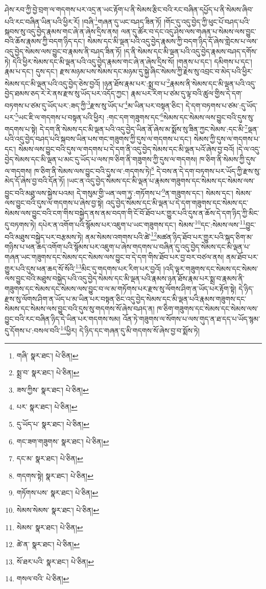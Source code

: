 ཤེས་རབ་ཀྱི་བྱེ་བྲག་ལ་གདགས་པར་འདྲ་ན་ཡང་རྟོག་པ་ནི་སེམས་རྩིང་བའི་རང་བཞིན་དཔྱོད་པ་ནི་སེམས་ཞིབ་པའི་རང་བཞིན་ཡིན་པའི་ཕྱིར་རོ། །བཞི་\footnote{གཞི་  སྣར་ཐང་།  པེ་ཅིན། }གཞན་དུ་ཡང་བཤད་ཟིན་ཏོ། །གོང་དུ་འདུ་བྱེད་ཀྱི་ཕུང་པོ་བཤད་པའི་སྐབས་སུ་འདུ་བྱེད་རྣམས་གང་ཞེ་ན་ཞེས་དྲིས་ནས། ལན་དུ་ཚོར་བ་དང་འདུ་ཤེས་ལས་གཞན་པ་སེམས་ལས་བྱུང་བའི་ཆོས་རྣམས་ཀྱི་བདག་ཉིད་དང་། སེམས་དང་མི་ལྡན་པའི་འདུ་བྱེད་རྣམས་ཀྱི་བདག་ཉིད་དོ་ཞེས་གླེངས་པ་ལས་འདུ་བྱེད་སེམས་ལས་བྱུང་བ་རྣམས་ནི་བཤད་ཟིན་ཏོ། །ད་ནི་སེམས་དང་མི་ལྡན་པའི་འདུ་བྱེད་རྣམས་བཤད་དགོས་ཏེ། དེའི་ཕྱིར་སེམས་དང་མི་ལྡན་པའི་འདུ་བྱེད་རྣམས་གང་ཞེ་ན་ཞེས་དྲིས་སོ། །གནས་པ་དང་། དམིགས་པ་དང་། རྣམ་པ་དང་། དུས་དང་། རྫས་མཉམ་པས་སེམས་དང་མཉམ་དུ་སྐྱེ་ཞིང་སེམས་ཀྱི་རྗེས་སུ་འབྲང་བ་མེད་པའི་ཕྱིར་སེམས་དང་མི་ལྡན་པའི་འདུ་བྱེད་ཅེས་བྱའོ། །ཉན་ཐོས་རྣམ་པར་:སྨྲ་བ་པ་\footnote{སྨྲ་བ་  སྣར་ཐང་།  པེ་ཅིན། }རྣམས་ནི་སེམས་དང་མི་ལྡན་པའི་འདུ་བྱེད་ཐམས་ཅད་རེ་རེ་ནས་རྫས་སུ་ཡོད་པར་འདོད་ཀྱང་། རྣམ་པར་རིག་པ་ཙམ་དུ་ལྟ་བའི་ཚུལ་གྱིས་དེ་དག་བཏགས་པ་ཙམ་དུ་ཡོད་པར་:ཟད་ཀྱི་\footnote{ཟས་ཀྱིས་  སྣར་ཐང་།  པེ་ཅིན། }རྫས་སུ་ཡོད་པ་\footnote{པར་  སྣར་ཐང་།  པེ་ཅིན། }མ་ཡིན་པར་བསྟན་ཅིང་། དེ་དག་བཏགས་པ་ཙམ་:དུ་ཡོད་པར་\footnote{དུ་ཡོད་པ་  སྣར་ཐང་།  པེ་ཅིན། }ཡང་ཇི་ལ་གདགས་པ་བསྟན་པའི་ཕྱིར། :གང་དག་གཟུགས་དང་\footnote{གང་ཟག་གཟུགས་  སྣར་ཐང་།  པེ་ཅིན། }སེམས་དང་སེམས་ལས་བྱུང་བའི་དུས་སུ་གདགས་པ་སྟེ། དེ་དག་ནི་སེམས་དང་མི་ལྡན་པའི་འདུ་བྱེད་ཡིན་ནོ་ཞེས་མ་སྨོས་སུ་ཟིན་ཀྱང་སེམས་:དང་མི་\footnote{དང་མ་  སྣར་ཐང་།  པེ་ཅིན། }ལྡན་པའི་འདུ་བྱེད་བཤད་པའི་སྐབས་ཡིན་པས་གང་གཟུགས་ཀྱི་དུས་ལ་གདགས་པ་དང་། སེམས་ཀྱི་དུས་ལ་གདགས་པ་དང་། སེམས་ལས་བྱུང་བའི་དུས་ལ་གདགས་པ་དེ་དག་ནི་འདུ་བྱེད་སེམས་དང་མི་ལྡན་པའོ་ཞེས་བྱ་བའོ། །དེ་ལ་འདུ་བྱེད་སེམས་དང་མི་ལྡན་པ་མང་དུ་ཡོད་པ་ལས་ཁ་ཅིག་ནི་གཟུགས་ཀྱི་དུས་ལ་གདགས། ཁ་ཅིག་ནི་སེམས་ཀྱི་དུས་ལ་གདགས། ཁ་ཅིག་ནི་སེམས་ལས་བྱུང་བའི་དུས་ལ་:གདགས་ཏེ།\footnote{གདགས་སྟེ།  སྣར་ཐང་།  པེ་ཅིན། } དེ་བས་ན་དེ་དག་བཏགས་པར་ཡོད་ཀྱི་རྫས་སུ་མེད་དོ་ཞེས་བྱ་བའི་དོན་ཏོ། །ཡང་ན་འདུ་བྱེད་སེམས་དང་མི་ལྡན་པ་རྣམས་གཟུགས་དང་སེམས་དང་སེམས་ལས་བྱུང་བའི་མཐུ་ལས་སྐྱེས་པའམ། དེ་གསུམ་གྱི་ཡན་ལག་ཏུ་:གཏོགས་པ་\footnote{གཏོགས་པས་  སྣར་ཐང་།  པེ་ཅིན། }ན་གཟུགས་དང་། སེམས་དང་། སེམས་ལས་བྱུང་བའི་དུས་ལ་གདགས་པ་ཞེས་བྱ་སྟེ། འདུ་བྱེད་སེམས་དང་མི་ལྡན་པ་དེ་དག་གཟུགས་དང་སེམས་དང་སེམས་ལས་བྱུང་བའི་ངག་གིས་བསྐྱེད་ནས་ནམ་བདག་གི་ངོ་བོ་ཐོབ་པར་གྱུར་པའི་དུས་ན་ཆོས་དེ་དག་ཉིད་ཀྱི་མིང་དུ་བཏགས་ཏེ། དཔེར་ན་འགོག་པའི་སྙོམས་པར་འཇུག་པ་ཡང་གཟུགས་དང་། སེམས་\footnote{སེམས་སེམས་  སྣར་ཐང་།  པེ་ཅིན། }དང་:སེམས་ལས་\footnote{སེམས་  སྣར་ཐང་།  པེ་ཅིན། }བྱུང་བའི་མཐུས་བསྐྱེད་པར་བརྩམས་ཏེ། ནམ་སེམས་འགགས་པའི་ཚེ་\footnote{ཚེ་ན་  སྣར་ཐང་།  པེ་ཅིན། }མཚན་ཉིད་ཐོབ་པར་གྱུར་པའི་སྐད་ཅིག་མ་གཉིས་པ་ཕན་ཆད་འགོག་པའི་སྙོམས་པར་འཇུག་པ་ཞེས་གདགས་པ་བཞིན་དུ་འདུ་བྱེད་སེམས་དང་མི་ལྡན་པ་གཞན་ཡང་གཟུགས་དང་སེམས་དང་སེམས་ལས་བྱུང་བ་དེ་དག་གིས་ཐོབ་པར་བྱ་བར་བཙལ་ནས། ནམ་ཐོབ་པར་གྱུར་པའི་དུས་ཕན་ཆད་སོ་སོའི་\footnote{སོ་ཐར་པའི་  སྣར་ཐང་།  པེ་ཅིན། }མིང་དུ་གདགས་པར་རིག་པར་བྱའོ། །འདི་ལྟར་གཟུགས་དང་སེམས་དང་སེམས་ལས་བྱུང་བའི་མཐུས་བསྐྱེད་པའི་འདུ་བྱེད་སེམས་དང་མི་ལྡན་པའི་རྣམས་ཉན་ཐོས་རྣམ་པར་སྨྲ་བ་རྣམས་ནི་གཟུགས་དང་སེམས་དང་སེམས་ལས་བྱུང་བ་ལ་མ་གཏོགས་པར་རྫས་སུ་ལོགས་ཤིག་ན་ཡོད་པར་རྟོག་སྟེ། དེ་ཉིད་རྫས་སུ་ལོགས་ཤིག་ན་ཡོད་པ་མ་ཡིན་པར་བསྟན་ཅིང་འདུ་བྱེད་སེམས་དང་མི་ལྡན་པའི་རྣམས་གཟུགས་དང་སེམས་དང་སེམས་ལས་བྱུང་བའི་དུས་སུ་གདགས་སོ་ཞེས་བཤད་ན། ཁ་ཅིག་གཟུགས་དང་སེམས་དང་སེམས་ལས་བྱུང་བའི་རང་བཞིན་ཉིད་དེ་ཡིན་པར་གདགས་སམ། འོན་ཏེ་གཟུགས་ལ་སོགས་པ་ལས་གུད་ན་ཐ་དད་པ་ཡོད་སྙམ་དུ་དོགས་པ་:བསལ་བའི་\footnote{གསལ་བའི་  པེ་ཅིན། }ཕྱིར། དེ་ཉིད་དང་གཞན་དུ་མི་གདགས་སོ་ཞེས་བྱ་བ་སྨོས་ཏེ། 